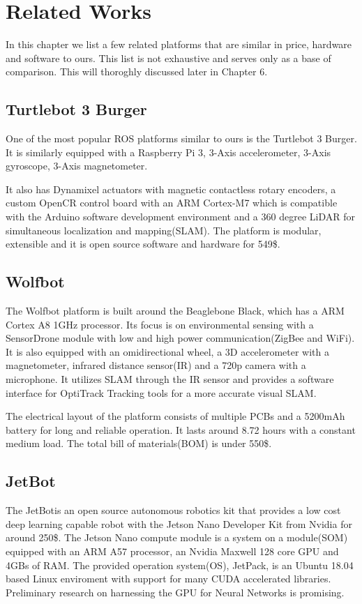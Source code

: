 \documentclass[class=article, crop=false]{standalone}
\begin{document}
\chapter{Related Works}\label{cha:related-works}
In this chapter we list a few related platforms that are similar in price, hardware and software to ours. This list is not exhaustive and serves only as a base of comparison. This will thoroghly discussed later in Chapter 6.


\section{Turtlebot 3 Burger}\label{sec:turtlebot3burger}
One of the most popular ROS platforms similar to ours is the Turtlebot 3 Burger\footnotemark. It is similarly equipped with a Raspberry Pi 3, 3-Axis accelerometer, 3-Axis gyroscope, 3-Axis magnetometer.

It also has Dynamixel actuators with magnetic contactless rotary encoders, a custom OpenCR control board with an ARM Cortex-M7 which is compatible with the Arduino software development environment and a 360 degree LiDAR for simultaneous localization and mapping(SLAM).
The platform is modular, extensible and it is open source software and hardware for 549\$\cite{turtlebot3}.


\section{Wolfbot}\label{sec:wolfbot}
The Wolfbot\cite{wolfbot} platform is built around the Beaglebone Black, which has a ARM Cortex A8 1GHz processor. Its focus is on environmental sensing with a SensorDrone module with low and high power communication(ZigBee and WiFi). It is also equipped with an omidirectional wheel, a 3D accelerometer with a magnetometer, infrared distance sensor(IR) and a 720p camera with a microphone. It utilizes SLAM through the IR sensor and provides a software interface for OptiTrack Tracking tools for a more accurate visual SLAM.

The electrical layout of the platform consists of multiple PCBs and a 5200mAh battery for long and reliable operation. It lasts around 8.72 hours with a constant medium load. The total bill of materials(BOM) is under 550\$.

\section{JetBot}\label{sec:jetbot}
The JetBot\footnotemark is an open source autonomous robotics kit that provides a low cost deep learning capable robot with the Jetson Nano Developer Kit from Nvidia for around 250\$.
\indent
The Jetson Nano compute module is a system on a module(SOM) equipped with an ARM A57 processor, an Nvidia Maxwell 128 core GPU and 4GBs of RAM. The provided operation system(OS), JetPack, is an Ubuntu 18.04 based Linux enviroment with support for many CUDA accelerated libraries. Preliminary research on harnessing the GPU for Neural Networks is promising\cite{hubbard2019}.
\end{document}
